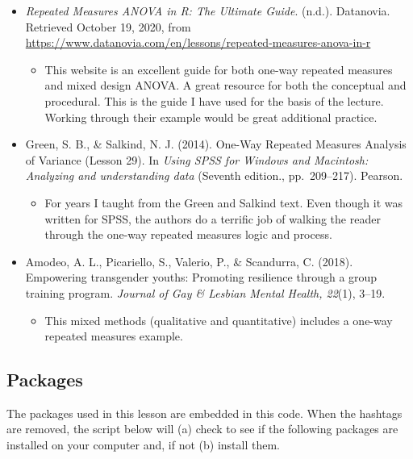 \documentclass[
  11pt,
]{book}
\providecommand{\tightlist}{%
  \setlength{\itemsep}{0pt}\setlength{\parskip}{0pt}}
\begin{document}
\begin{itemize}
\tightlist
\item
  \emph{Repeated Measures ANOVA in R: The Ultimate Guide}. (n.d.). Datanovia. Retrieved October 19, 2020, from \url{https://www.datanovia.com/en/lessons/repeated-measures-anova-in-r}

  \begin{itemize}
  \tightlist
  \item
    This website is an excellent guide for both one-way repeated measures and mixed design ANOVA. A great resource for both the conceptual and procedural. This is the guide I have used for the basis of the lecture. Working through their example would be great additional practice.
  \end{itemize}
\item
  Green, S. B., \& Salkind, N. J. (2014). One-Way Repeated Measures Analysis of Variance (Lesson 29). In \emph{Using SPSS for Windows and Macintosh: Analyzing and understanding data} (Seventh edition., pp.~209--217). Pearson.

  \begin{itemize}
  \tightlist
  \item
    For years I taught from the Green and Salkind text. Even though it was written for SPSS, the authors do a terrific job of walking the reader through the one-way repeated measures logic and process.
  \end{itemize}
\item
  Amodeo, A. L., Picariello, S., Valerio, P., \& Scandurra, C. (2018). Empowering transgender youths: Promoting resilience through a group training program. \emph{Journal of Gay \& Lesbian Mental Health, 22}(1), 3--19.

  \begin{itemize}
  \tightlist
  \item
    This mixed methods (qualitative and quantitative) includes a one-way repeated measures example.
  \end{itemize}
\end{itemize}

\hypertarget{packages-5}{%
\subsection{Packages}\label{packages-5}}

The packages used in this lesson are embedded in this code. When the hashtags are removed, the script below will (a) check to see if the following packages are installed on your computer and, if not (b) install them.
\end{document}

